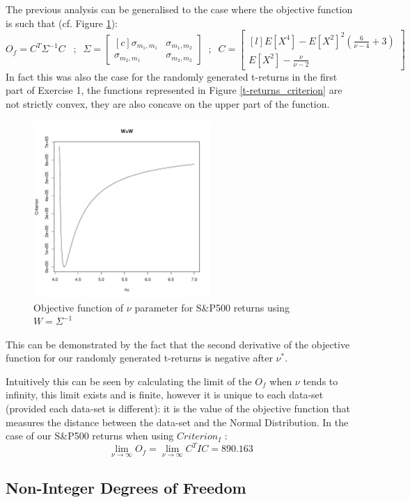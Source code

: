 The previous analysis can be generalised to the case where the objective function is such that (cf. Figure \ref{ConcavitySPW}):
\begin{equation*}
    O_f = C^T \Sigma^{-1} C \; \; \; ; \; \;
        \Sigma=
    \begin{bmatrix}[c]
        \sigma_{m_1,m_1}    & \sigma_{m_1,m_2} \\
        \sigma_{m_2,m_1}    & \sigma_{m_2,m_2}
    \end{bmatrix}
    \;\; ; \; \; C = 
    \begin{bmatrix}[l]
        E[X^4]-E[X^2]^2(\frac{6}{\nu-4}+3)  \\
        E[X^2]-\frac{\nu}{\nu-2}
    \end{bmatrix}
\end{equation*}
In fact this was also the case for the randomly generated t-returns in the first part of Exercise 1, the functions represented in Figure \ref{t-returns_criterion} are not strictly convex, they are also concave on the upper part of the function.
\begin{figure}
    \centering
    \includegraphics[width=0.6\textwidth]{ConcavityS&PW.pdf}
    \caption{Objective function of $\nu$ parameter for S\&P500 returns using $W=\Sigma^{-1}$}
    \label{ConcavitySPW}
\end{figure}
This can be demonstrated by the fact that the second derivative of the objective function for our randomly generated t-returns is negative after $\nu^*$.
\smallskip\par
Intuitively this can be seen by calculating the limit of the $O_f$ when $\nu$ tends to infinity, this limit exists and is finite, however it is unique to each data-set (provided each data-set is different): it is the value of the objective function that measures the distance between the data-set and the Normal Distribution. In the case of our S\&P500 returns when using $Criterion_I$ :
\begin{equation*}
    \lim_{\nu \to \infty}O_f = \lim_{\nu \to \infty}C^T I C = 890.163
\end{equation*}

\subsection{Non-Integer Degrees of Freedom}